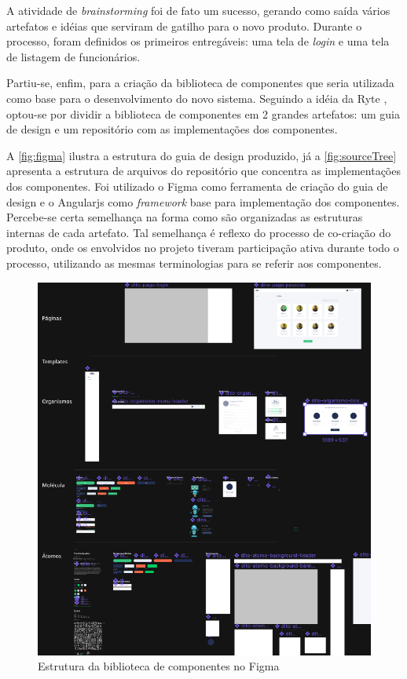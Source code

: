 A atividade de \textit{brainstorming} foi de fato um sucesso, gerando como saída vários artefatos e idéias que serviram de gatilho para o novo produto. Durante o processo, foram definidos os primeiros entregáveis: uma tela de \textit{login} e uma tela de listagem de funcionários.

Partiu-se, enfim, para a criação da biblioteca de componentes que seria utilizada como base para o desenvolvimento do novo sistema. Seguindo a idéia da Ryte \cite{ryteDesignSystem}, optou-se por dividir a biblioteca de componentes em 2 grandes artefatos: um guia de design e um repositório com as implementações dos componentes.

A \autoref{fig:figma} ilustra a estrutura do guia de design produzido, já a \autoref{fig:sourceTree} apresenta a estrutura de arquivos do repositório que concentra as implementações dos componentes. Foi utilizado o Figma como ferramenta de criação do guia de design e o Angularjs como \textit{framework} base para implementação dos componentes. Percebe-se certa semelhança na forma como são organizadas as estruturas internas de cada artefato. Tal semelhança é reflexo do processo de co-criação do produto, onde os envolvidos no projeto tiveram participação ativa durante todo o processo, utilizando as mesmas terminologias para se referir aos componentes.

\begin{figure}
	\includegraphics[width=\linewidth]{./04-figuras/06_biblioteca_componentes/styleguide-figma.png}
  \caption{Estrutura da biblioteca de componentes no Figma}
  \label{fig:figma}
\end{figure}

